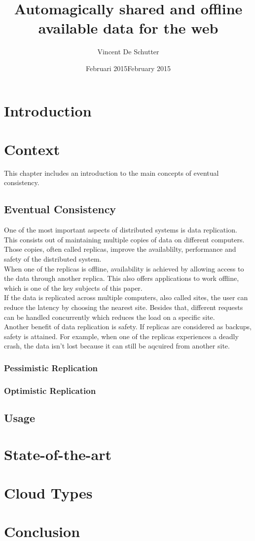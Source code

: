 \documentclass[a4paper,12pt]{report}
\author{Vincent De Schutter}
\title{Automagically shared and offline \\available data for the web}
\date{Februari 2015}
\begin{document}
\maketitlepage


\date{February 2015}

\maketitlepage


\section{Introduction} %
\section{Context} %

This chapter includes an introduction to the main concepts of eventual consistency. 

\subsection{Eventual Consistency} 

One of the most important aspects of distributed systems is data replication. This consists out of maintaining multiple copies of data on different computers. Those copies, often called replicas, improve the availablilty, performance and safety of the distributed system. \\
When one of the replicas is offline, availability is achieved by allowing access to the data through another replica. This also offers applications to work offline, which is one of the key subjects of this paper. \\
If the data is replicated across multiple computers, also called sites, the user can reduce the latency by choosing the nearest site. Besides that, different requests can be handled concurrently which reduces the load on a specific site. \\
Another benefit of data replication is safety. If replicas are considered as backups, safety is attained. For example, when one of the replicas experiences a deadly crash, the data isn't lost because it can still be aqcuired from another site.

\subsubsection{Pessimistic Replication}
\subsubsection{Optimistic Replication}
\subsection{Usage}
\section{State-of-the-art} %
\section{Cloud Types} %
\section{Conclusion} %
\end{document}
